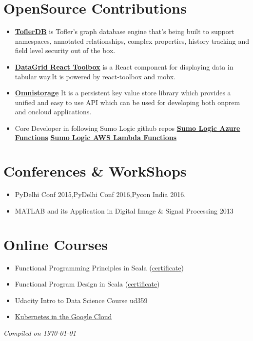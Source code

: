 \documentclass[margin,line]{resume}
\begin{document}
\begin{resume}
\section{\mysidestyle OpenSource Contributions}
\vspace{0mm}
    \begin{itemize}
                \item \href{https://github.com/tofler/toflerdb}{\textbf{ToflerDB}} is Tofler's graph database engine that's being built to support namespaces, annotated relationships, complex properties, history tracking and field level security out of the box.
                \item \href{https://github.com/tofler/datagrid-react-toolbox}{\textbf{DataGrid React Toolbox}} is a React component for displaying data in tabular way.It is powered by react-toolbox and mobx.
                \item \href{https://github.com/Sumologic/sumologic-omnistorage}{\textbf{Omnistorage}} It is a persistent key value store library which provides a unified and easy to use API which can be used for developing both onprem and oncloud applications.
                \item Core Developer in following Sumo Logic github repos
                \subitem \href{https://github.com/SumoLogic/sumologic-azure-function}{\textbf{Sumo Logic Azure Functions}}
                \subitem \href{https://github.com/SumoLogic/sumologic-aws-lambda}{\textbf{Sumo Logic AWS Lambda Functions}}

    \end{itemize}
\section{\mysidestyle Conferences \& WorkShops}
\vspace{0mm}
    \begin{itemize}
           \item PyDelhi Conf 2015,PyDelhi Conf 2016,Pycon India 2016.
           \item MATLAB and its Application in Digital Image \& Signal Processing 2013
    \end{itemize}

\section{\mysidestyle Online Courses}
\vspace{0mm}
    \begin{itemize}
        \item Functional Programming Principles in Scala (\href{https://www.coursera.org/account/accomplishments/verify/AU47C6WSX6NR}{certificate})
        \item Functional Program Design in Scala (\href{https://www.coursera.org/account/accomplishments/certificate/VUBNK7HMZENA}{certificate})
        \item Udacity Intro to Data Science Course ud359
        \item \href{https://google.qwiklabs.com/quests/29}{Kubernetes in the Google Cloud}
    \end{itemize}

\hfill \textsl{Compiled on \monthyeardate\today}
%
\end{resume}
\end{document}
